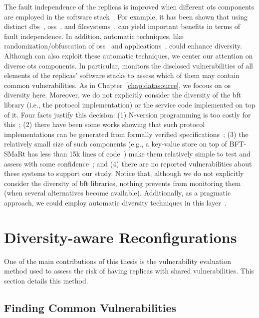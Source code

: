 The fault independence of the replicas is improved when different \gls{ots} components are employed in the software stack~\cite{Deswarte:1998}. 
For example, it has been shown that using distinct \glspl{db}~\cite{Gashi:2007}, \glspl{os}~\cite{Garcia:2013}, and filesystems~\cite{Castro:2003,Bairavasundaram:2009}, can yield important benefits in terms of fault independence. 
In addition, automatic techniques, like randomization/obfuscation of \glspl{os}~\cite{Roeder:2010} and applications~\cite{King:2016}, could enhance diversity.
Although \system can also exploit these automatic techniques, we center our attention on diverse \gls{ots} components. 
In particular, \system monitors the disclosed vulnerabilities of all elements of the replicas' software stacks to assess which of them may contain common vulnerabilities.  
As in Chapter~\ref{chap:datasource}, we focous on \gls{os} diversity here. 
Moreover, we do not explicitly consider the diversity of the \gls{bft} library (i.e., the protocol implementation) or the service code implemented on top of it.
Four facts justify this decision: (1) N-version programming is too costly for this~\cite{Avizienis:1977}; (2) there have been some works showing that such protocol implementations can be generated from formally verified specifications~\cite{Hawblitzel:2015,Rahli:2018}; (3) the relatively small size of such components (e.g., a key-value store on top of BFT-SMaRt has less than 15k lines of code~\cite{Bessani:2014}) make them relatively simple to test and assess with some confidence~\cite{Martins:2013,Lee:2014}; and (4) there are no reported vulnerabilities about these systems to support our study.
Notice that, although we do not explicitly consider the diversity of \gls{bft} libraries, nothing prevents \system from monitoring them (when several alternatives become available). 
Additionally, as a pragmatic approach, we could employ automatic diversity techniques in this layer~\cite{Platania:2014,Roeder:2010}.


\section{Diversity-aware Reconfigurations}
\label{sec:metric}

One of the main contributions of this thesis is the vulnerability evaluation method used to assess the risk of having replicas with shared vulnerabilities.
This section details this method.

\subsection{Finding Common Vulnerabilities}
\label{sec:common_vulnerabilities}

